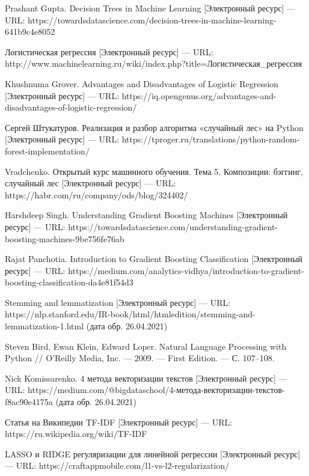 \documentclass[14pt]{mmcs_article}
\begin{document}
\begin{thebibliography}{0}
Prashant Gupta. Decision Trees in Machine Learning [Электронный ресурс] --- URL:  https://towardsdatascience.com/decision-trees-in-machine-learning-641b9c4e8052

Логистическая регрессия [Электронный ресурс] --- URL:  http://www.machinelearning.ru/wiki/index.php?title=Логистическая\_регрессия 

Khushnuma Grover. Advantages and Disadvantages of Logistic Regression [Электронный ресурс] --- URL:  https://iq.opengenus.org/advantages-and-disadvantages-of-logistic-regression/ 

Сергей Штукатуров. Реализация и разбор алгоритма «случайный лес» на Python [Электронный ресурс] --- URL: https://tproger.ru/translations/python-random-forest-implementation/

Vradchenko. Открытый курс машинного обучения. Тема 5. Композиции: бэггинг, случайный лес [Электронный ресурс] --- URL: https://habr.com/ru/company/ods/blog/324402/ 

Harshdeep Singh. Understanding Gradient Boosting Machines [Электронный ресурс] --- URL: https://towardsdatascience.com/understanding-gradient-boosting-machines-9be756fe76ab

Rajat Panchotia. Introduction to Gradient Boosting Classification [Электронный ресурс] --- URL: https://medium.com/analytics-vidhya/introduction-to-gradient-boosting-classification-da4e81f54d3

Stemming and lemmatization [Электронный ресурс] --- URL: https://nlp.stanford.edu/IR-book/html/htmledition/stemming-and-lemmatization-1.html (дата обр. 26.04.2021)

Steven Bird, Ewan Klein, Edward Loper. Natural Language Processing with Python // O’Reilly Media, Inc. — 2009. — First Edition. — С. 107–108.

Nick Komissarenko. 4 метода векторизации текстов [Электронный ресурс] --- URL: https://medium.com/@bigdataschool/4-метода-векторизации-текстов-f8ac90e4175a (дата обр. 26.04.2021)

Статья на Википедии TF-IDF [Электронный ресурс] --- URL: https://ru.wikipedia.org/wiki/TF-IDF 

LASSO и RIDGE регуляризации для линейной регрессии [Электронный ресурс] --- URL: https://craftappmobile.com/l1-vs-l2-regularization/


\end{thebibliography}
\end{document}
